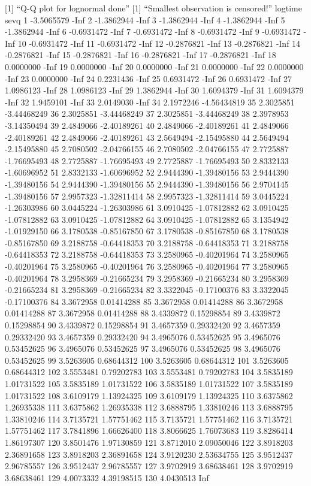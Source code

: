 \documentclass[
]{article}
\begin{document}
{[}1{]} ``Q-Q plot for lognormal done'' {[}1{]} ``Smallest observation
is censored!'' logtime sevq 1 -3.5065579 -Inf 2 -1.3862944 -Inf 3
-1.3862944 -Inf 4 -1.3862944 -Inf 5 -1.3862944 -Inf 6 -0.6931472 -Inf 7
-0.6931472 -Inf 8 -0.6931472 -Inf 9 -0.6931472 -Inf 10 -0.6931472 -Inf
11 -0.6931472 -Inf 12 -0.2876821 -Inf 13 -0.2876821 -Inf 14 -0.2876821
-Inf 15 -0.2876821 -Inf 16 -0.2876821 -Inf 17 -0.2876821 -Inf 18
0.0000000 -Inf 19 0.0000000 -Inf 20 0.0000000 -Inf 21 0.0000000 -Inf 22
0.0000000 -Inf 23 0.0000000 -Inf 24 0.2231436 -Inf 25 0.6931472 -Inf 26
0.6931472 -Inf 27 1.0986123 -Inf 28 1.0986123 -Inf 29 1.3862944 -Inf 30
1.6094379 -Inf 31 1.6094379 -Inf 32 1.9459101 -Inf 33 2.0149030 -Inf 34
2.1972246 -4.56434819 35 2.3025851 -3.44468249 36 2.3025851 -3.44468249
37 2.3025851 -3.44468249 38 2.3978953 -3.14350494 39 2.4849066
-2.40189261 40 2.4849066 -2.40189261 41 2.4849066 -2.40189261 42
2.4849066 -2.40189261 43 2.5649494 -2.15495880 44 2.5649494 -2.15495880
45 2.7080502 -2.04766155 46 2.7080502 -2.04766155 47 2.7725887
-1.76695493 48 2.7725887 -1.76695493 49 2.7725887 -1.76695493 50
2.8332133 -1.60696952 51 2.8332133 -1.60696952 52 2.9444390 -1.39480156
53 2.9444390 -1.39480156 54 2.9444390 -1.39480156 55 2.9444390
-1.39480156 56 2.9704145 -1.39480156 57 2.9957323 -1.32811414 58
2.9957323 -1.32811414 59 3.0445224 -1.26303986 60 3.0445224 -1.26303986
61 3.0910425 -1.07812882 62 3.0910425 -1.07812882 63 3.0910425
-1.07812882 64 3.0910425 -1.07812882 65 3.1354942 -1.01929150 66
3.1780538 -0.85167850 67 3.1780538 -0.85167850 68 3.1780538 -0.85167850
69 3.2188758 -0.64418353 70 3.2188758 -0.64418353 71 3.2188758
-0.64418353 72 3.2188758 -0.64418353 73 3.2580965 -0.40201964 74
3.2580965 -0.40201964 75 3.2580965 -0.40201964 76 3.2580965 -0.40201964
77 3.2580965 -0.40201964 78 3.2958369 -0.21665234 79 3.2958369
-0.21665234 80 3.2958369 -0.21665234 81 3.2958369 -0.21665234 82
3.3322045 -0.17100376 83 3.3322045 -0.17100376 84 3.3672958 0.01414288
85 3.3672958 0.01414288 86 3.3672958 0.01414288 87 3.3672958 0.01414288
88 3.4339872 0.15298854 89 3.4339872 0.15298854 90 3.4339872 0.15298854
91 3.4657359 0.29332420 92 3.4657359 0.29332420 93 3.4657359 0.29332420
94 3.4965076 0.53452625 95 3.4965076 0.53452625 96 3.4965076 0.53452625
97 3.4965076 0.53452625 98 3.4965076 0.53452625 99 3.5263605 0.68644312
100 3.5263605 0.68644312 101 3.5263605 0.68644312 102 3.5553481
0.79202783 103 3.5553481 0.79202783 104 3.5835189 1.01731522 105
3.5835189 1.01731522 106 3.5835189 1.01731522 107 3.5835189 1.01731522
108 3.6109179 1.13924325 109 3.6109179 1.13924325 110 3.6375862
1.26935338 111 3.6375862 1.26935338 112 3.6888795 1.33810246 113
3.6888795 1.33810246 114 3.7135721 1.57751462 115 3.7135721 1.57751462
116 3.7135721 1.57751462 117 3.7841896 1.66626400 118 3.8066625
1.76073683 119 3.8286414 1.86197307 120 3.8501476 1.97130859 121
3.8712010 2.09050046 122 3.8918203 2.36891658 123 3.8918203 2.36891658
124 3.9120230 2.53634755 125 3.9512437 2.96785557 126 3.9512437
2.96785557 127 3.9702919 3.68638461 128 3.9702919 3.68638461 129
4.0073332 4.39198515 130 4.0430513 Inf
\end{document}
